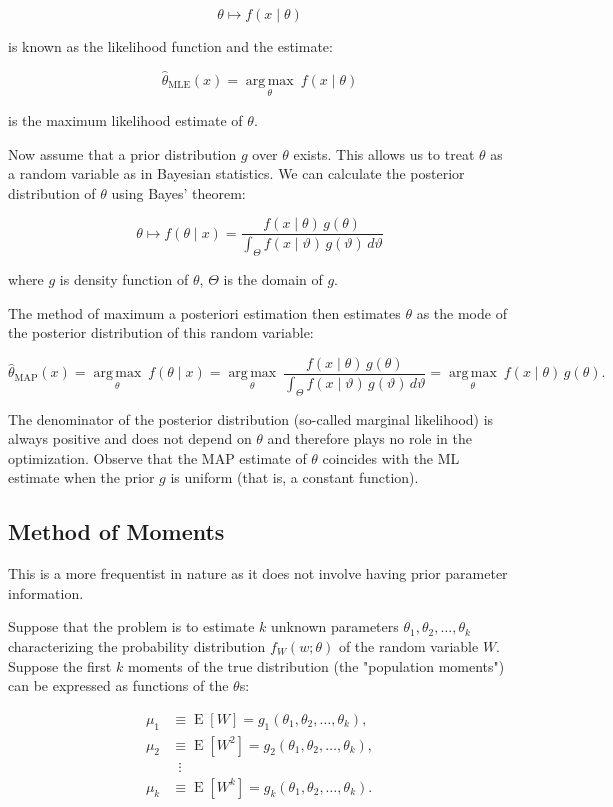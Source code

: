 \documentclass[english]{article}
\numberwithin{equation}{section}
\begin{document}
$$\theta \mapsto f(x \mid \theta)$$

is known as the likelihood function and the estimate:

$$\hat{\theta}_{\mathrm{MLE}}(x) = \underset{\theta}{\operatorname{arg\,max}} \ f(x \mid \theta) \!$$

is the maximum likelihood estimate of $\theta$.

Now assume that a prior distribution $g$ over $\theta$ exists.  This allows us to treat $\theta$ as a random variable as in Bayesian statistics.  We can calculate the posterior distribution of $\theta$ using Bayes' theorem:

$$\theta \mapsto f(\theta \mid x) = \frac{f(x \mid \theta) \, g(\theta)}{\displaystyle\int_{\Theta} f(x \mid \vartheta) \, g(\vartheta) \, d\vartheta}$$

where $g$ is density function of $\theta$, $\Theta$ is the domain of $g$.

The method of maximum a posteriori estimation then estimates $\theta$ as the mode of the posterior distribution of this random variable:

$$\hat{\theta}_{\mathrm{MAP}}(x)
= \underset{\theta}{\operatorname{arg\,max}} \ f(\theta \mid x)
= \underset{\theta}{\operatorname{arg\,max}} \ \frac{f(x \mid \theta) \, g(\theta)}
{\displaystyle\int_{\Theta} f(x \mid \vartheta) \, g(\vartheta) \, d\vartheta}
= \underset{\theta}{\operatorname{arg\,max}} \ f(x \mid \theta) \, g(\theta).
$$

The denominator of the posterior distribution (so-called marginal likelihood) is always positive and does not depend on $\theta$ and therefore plays no role in the optimization. Observe that the MAP estimate of $\theta$ coincides with the ML estimate when the prior $g$ is uniform (that is, a constant function).

\subsection*{Method of Moments}
This is a more frequentist in nature as it does not involve having prior parameter information.

Suppose that the problem is to estimate $k$ unknown parameters $\theta_{1}, \theta_2, \dots, \theta_k$ characterizing the probability distribution $f_W(w; \theta)$ of the random variable $W$. Suppose the first $k$ moments of the true distribution (the "population moments") can be expressed as functions of the  $\theta$s:

\begin{align}
\mu_1 & \equiv \operatorname E[W]=g_1(\theta_1, \theta_2, \ldots, \theta_k) , \\
\mu_2 & \equiv \operatorname E[W^2]=g_2(\theta_1, \theta_2, \ldots, \theta_k), \\
& \,\,\, \vdots \\
\mu_k & \equiv \operatorname E[W^k]=g_k(\theta_1, \theta_2, \ldots, \theta_k).
\end{align}
\end{document}
